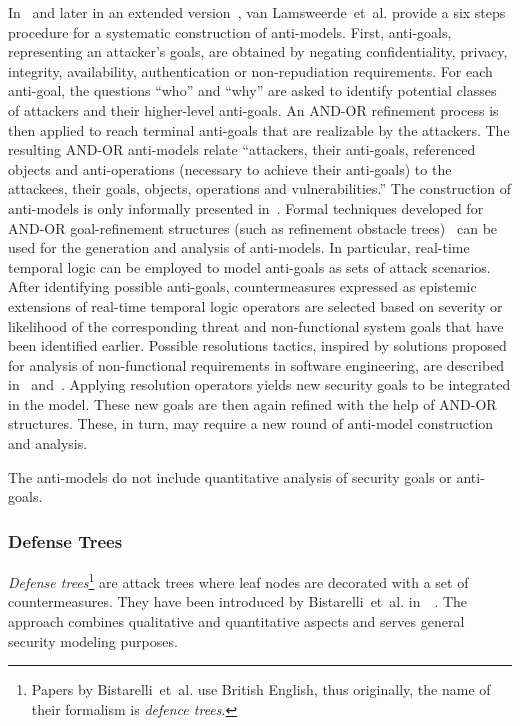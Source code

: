 \documentclass[a4paper]{article}
\begin{document}
In~\cite{LaBrLaJa} and later in an extended version~\cite{Lams}, van
Lamsweerde~et~al. provide a six steps procedure for a systematic construction 
of anti-models. First, anti-goals, representing an attacker's goals, are 
obtained by negating confidentiality, privacy, integrity, availability,
authentication or non-repudiation requirements. For each anti-goal, the
questions ``who'' and ``why'' are asked to identify potential classes of 
attackers and their higher-level anti-goals. An AND-OR refinement process is
then applied to reach terminal anti-goals that are realizable by the attackers. 
The resulting AND-OR anti-models relate ``attackers, their anti-goals, 
referenced objects and anti-operations (necessary to achieve their anti-goals) 
to the attackees, their goals, objects, operations and vulnerabilities.'' The
construction of anti-models is only informally presented in~\cite{LaBrLaJa}.
Formal techniques developed for AND-OR goal-refinement structures (such as
refinement obstacle trees)~\cite{LaLe} can be used for the generation and
analysis of anti-models. In particular, real-time temporal logic can be 
employed to model anti-goals as sets of attack scenarios. After identifying
possible anti-goals, countermeasures expressed as epistemic extensions of
real-time temporal logic operators are selected based on severity or likelihood
of the corresponding threat and non-functional system goals that have been
identified earlier. Possible resolutions tactics, inspired by solutions 
proposed for analysis of non-functional requirements in software engineering, 
are described in~\cite{LaLe} and~\cite{Lams}. Applying resolution operators 
yields new security goals to be integrated in the model. These new goals are
then again refined with the help of AND-OR structures. These, in turn, may
require a new round of anti-model construction and analysis. 

The anti-models do not include quantitative analysis of security goals or
anti-goals. 

\subsubsection{Defense Trees} 
\label{sec:defense_trees}

\emph{Defense trees}\footnote{Papers by Bistarelli~et~al. use British English,
thus originally, the name of their formalism is \emph{defence trees}.} are
attack trees where leaf nodes are decorated with a set of countermeasures.
They have been introduced by Bistarelli~et~al. in~~\cite{BiFiPe}. The
approach combines qualitative and quantitative aspects and serves general
security modeling purposes.
\end{document}
